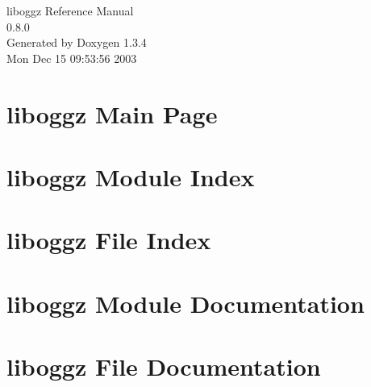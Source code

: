 \documentclass[a4paper]{book}
\begin{document}
\begin{titlepage}
\vspace*{7cm}
\begin{center}
{\Large liboggz Reference Manual\\[1ex]\large 0.8.0 }\\
\vspace*{1cm}
{\large Generated by Doxygen 1.3.4}\\
\vspace*{0.5cm}
{\small Mon Dec 15 09:53:56 2003}\\
\end{center}
\end{titlepage}
\clearemptydoublepage
{}
\tableofcontents
\clearemptydoublepage
{}
\chapter{liboggz Main Page}
\label{index}
\chapter{liboggz Module Index}

\chapter{liboggz File Index}

\chapter{liboggz Module Documentation}










\chapter{liboggz File Documentation}



\printindex
\end{document}
